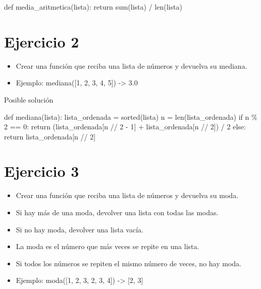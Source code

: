 \documentclass[
  a4paper,
  DIV=11,
  numbers=noendperiod,
  onepage,
  openany]{scrreprt}
\newenvironment{Shaded}{\begin{snugshade}}{\end{snugshade}}
\newcommand{\BuiltInTok}[1]{\textcolor[rgb]{0.00,0.23,0.31}{#1}}
\newcommand{\ControlFlowTok}[1]{\textcolor[rgb]{0.00,0.23,0.31}{#1}}
\newcommand{\DecValTok}[1]{\textcolor[rgb]{0.68,0.00,0.00}{#1}}
\newcommand{\KeywordTok}[1]{\textcolor[rgb]{0.00,0.23,0.31}{#1}}
\newcommand{\NormalTok}[1]{\textcolor[rgb]{0.00,0.23,0.31}{#1}}
\newcommand{\OperatorTok}[1]{\textcolor[rgb]{0.37,0.37,0.37}{#1}}
\providecommand{\tightlist}{%
  \setlength{\itemsep}{0pt}\setlength{\parskip}{0pt}}\usepackage{longtable,booktabs,array}
\begin{document}
\begin{Shaded}
\begin{Highlighting}[]
\KeywordTok{def}\NormalTok{ media\_aritmetica(lista):}
    \ControlFlowTok{return} \BuiltInTok{sum}\NormalTok{(lista) }\OperatorTok{/} \BuiltInTok{len}\NormalTok{(lista)}
\end{Highlighting}
\end{Shaded}

\section{Ejercicio 2}\label{ejercicio-2-2}

\begin{itemize}
\tightlist
\item
  Crear una función que reciba una lista de números y devuelva su
  mediana.
\item
  Ejemplo: mediana({[}1, 2, 3, 4, 5{]}) -\textgreater{} 3.0
\end{itemize}

Posible solución

\begin{Shaded}
\begin{Highlighting}[]
\KeywordTok{def}\NormalTok{ mediana(lista):}
\NormalTok{    lista\_ordenada }\OperatorTok{=} \BuiltInTok{sorted}\NormalTok{(lista)}
\NormalTok{    n }\OperatorTok{=} \BuiltInTok{len}\NormalTok{(lista\_ordenada)}
    \ControlFlowTok{if}\NormalTok{ n }\OperatorTok{\%} \DecValTok{2} \OperatorTok{==} \DecValTok{0}\NormalTok{:}
        \ControlFlowTok{return}\NormalTok{ (lista\_ordenada[n }\OperatorTok{//} \DecValTok{2} \OperatorTok{{-}} \DecValTok{1}\NormalTok{] }\OperatorTok{+}\NormalTok{ lista\_ordenada[n }\OperatorTok{//} \DecValTok{2}\NormalTok{]) }\OperatorTok{/} \DecValTok{2}
    \ControlFlowTok{else}\NormalTok{:}
        \ControlFlowTok{return}\NormalTok{ lista\_ordenada[n }\OperatorTok{//} \DecValTok{2}\NormalTok{]}
\end{Highlighting}
\end{Shaded}

\section{Ejercicio 3}\label{ejercicio-3-2}

\begin{itemize}
\tightlist
\item
  Crear una función que reciba una lista de números y devuelva su moda.
\item
  Si hay más de una moda, devolver una lista con todas las modas.
\item
  Si no hay moda, devolver una lista vacía.
\item
  La moda es el número que más veces se repite en una lista.
\item
  Si todos los números se repiten el mismo número de veces, no hay moda.
\item
  Ejemplo: moda({[}1, 2, 3, 2, 3, 4{]}) -\textgreater{} {[}2, 3{]}
\end{itemize}
\end{document}
